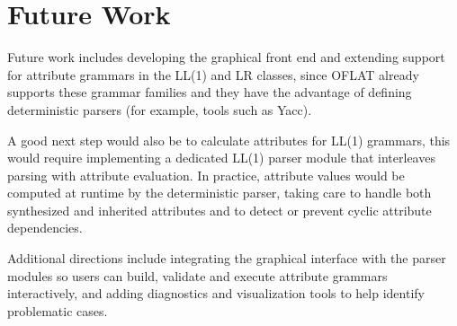 \section{Future Work}

Future work includes developing the graphical front end and extending support for attribute grammars in the LL(1) and LR classes, 
since OFLAT already supports these grammar families and they have the advantage of defining deterministic parsers (for example, tools such as Yacc).  

A good next step would also be to calculate attributes for LL(1) grammars, this would 
require implementing a dedicated LL(1) parser module that interleaves parsing with attribute evaluation. In practice, attribute values would be computed at 
runtime by the deterministic parser, taking care to handle both synthesized and inherited attributes and to detect or prevent cyclic attribute dependencies.  

Additional directions include integrating the graphical interface with the parser modules so users can build, validate and execute attribute grammars 
interactively, and adding diagnostics and visualization tools to help identify problematic cases.
